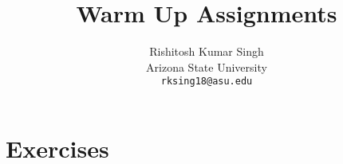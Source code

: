 \documentclass[10pt,twocolumn,letterpaper]{article}
\title{Warm Up Assignments}
\author{Rishitosh Kumar Singh\\
Arizona State University\\
{\tt\small rksing18@asu.edu}
}
\begin{document}
\maketitle


    
    

\section{Exercises}
\label{sec:exercises}












{
    \small
    
    
}

% 
\end{document}
